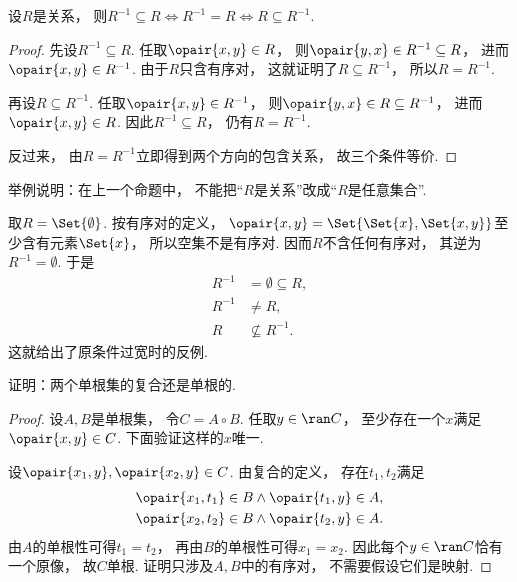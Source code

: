 \begin{proposition}\label{theorem:集合论.与逆相等的充分必要条件}
    设\(R\)是关系，
    则\(R^{-1} \subseteq R
    \iff R^{-1} = R
    \iff R \subseteq R^{-1}\).
    \begin{proof}
        先设\(R^{-1}\subseteq R\).
        任取\(\opair{x,y}\in R\)，
        则\(\opair{y,x}\in R^{-1}\subseteq R\)，
        进而\(\opair{x,y}\in R^{-1}\).
        由于\(R\)只含有序对，
        这就证明了\(R\subseteq R^{-1}\)，
        所以\(R=R^{-1}\).

        再设\(R\subseteq R^{-1}\).
        任取\(\opair{x,y}\in R^{-1}\)，
        则\(\opair{y,x}\in R\subseteq R^{-1}\)，
        进而\(\opair{x,y}\in R\).
        因此\(R^{-1}\subseteq R\)，
        仍有\(R=R^{-1}\).

        反过来，
        由\(R=R^{-1}\)立即得到两个方向的包含关系，
        故三个条件等价.
    \end{proof}
\end{proposition}

\begin{example}
    举例说明：在上一个命题中，
    不能把“\(R\)是关系”改成“\(R\)是任意集合”.
    \begin{solution}
        取\(R=\Set{\emptyset}\).
        按有序对的定义，
        \(\opair{x,y}=\Set{\Set{x},\Set{x,y}}\)至少含有元素\(\Set{x}\)，
        所以空集不是有序对.
        因而\(R\)不含任何有序对，
        其逆为\(R^{-1}=\emptyset\).
        于是
        \begin{align*}
            R^{-1} &=\emptyset\subseteq R, \\
            R^{-1} &\neq R, \\
            R &\nsubseteq R^{-1}.
        \end{align*}
        这就给出了原条件过宽时的反例.
    \end{solution}
\end{example}

\begin{example}\label{example:集合论.两个单根集的复合是单根的}
    证明：两个单根集的复合还是单根的.
    \begin{proof}
        设\(A,B\)是单根集，
        令\(C=A\circ B\).
        任取\(y\in\ran C\)，
        至少存在一个\(x\)满足\(\opair{x,y}\in C\).
        下面验证这样的\(x\)唯一.

        设\(\opair{x_1,y},\opair{x_2,y}\in C\).
        由复合的定义，
        存在\(t_1,t_2\)满足
        \begin{align*}
            \opair{x_1,t_1}\in B &\land\opair{t_1,y}\in A, \\
            \opair{x_2,t_2}\in B &\land\opair{t_2,y}\in A.
        \end{align*}
        由\(A\)的单根性可得\(t_1=t_2\)，
        再由\(B\)的单根性可得\(x_1=x_2\).
        因此每个\(y\in\ran C\)恰有一个原像，
        故\(C\)单根.
        证明只涉及\(A,B\)中的有序对，
        不需要假设它们是映射.
    \end{proof}
\end{example}

